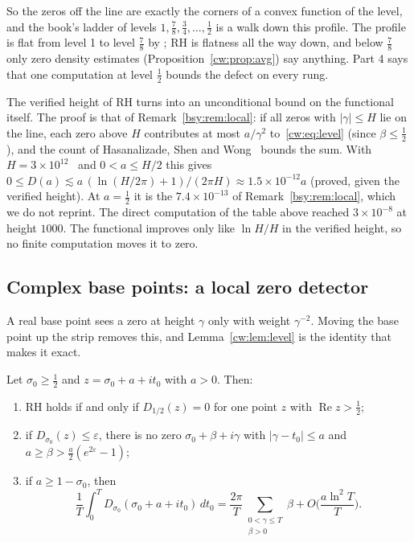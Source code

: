 So the zeros off the line are exactly the corners of a convex function of the level, and the book's ladder of levels $1,\frac78,\frac34,\dots,\frac12$ is a walk down this profile. The profile is flat from level 1 to level $\frac78$ by \cite{OAI26a}; RH is flatness all the way down, and below $\frac78$ only zero density estimates (Proposition~\ref{cw:prop:avg}) say anything. Part 4 says that one computation at level $\frac12$ bounds the defect on every rung.

The verified height of RH turns into an unconditional bound on the functional itself. The proof is that of Remark~\ref{bsy:rem:local}: if all zeros with $|\gamma|\le H$ lie on the line, each zero above $H$ contributes at most $a/\gamma^2$ to~\eqref{cw:eq:level} (since $\beta\le\frac12$), and the count of Hasanalizade, Shen and Wong~\cite{HSW22} bounds the sum. With $H=3\times10^{12}$~\cite{PT21} and $0<a\le H/2$ this gives $0\le D(a)\lesssim a\,(\ln(H/2\pi)+1)/(2\pi H)\approx1.5\times10^{-12}a$ (proved, given the verified height). At $a=\frac12$ it is the $7.4\times10^{-13}$ of Remark~\ref{bsy:rem:local}, which we do not reprint. The direct computation of the table above reached $3\times10^{-8}$ at height $1000$. The functional improves only like $\ln H/H$ in the verified height, so no finite computation moves it to zero.

\subsection{Complex base points: a local zero detector}\label{cw:sec:local}
A real base point sees a zero at height $\gamma$ only with weight $\gamma^{-2}$. Moving the base point up the strip removes this, and Lemma~\ref{cw:lem:level} is the identity that makes it exact.

\begin{theorem}[proved]\label{cw:thm:local}
Let $\sigma_0\ge\frac12$ and $z=\sigma_0+a+it_0$ with $a>0$. Then:
\begin{enumerate}
\item RH holds if and only if $D_{1/2}(z)=0$ for one point $z$ with $\operatorname{Re}z>\frac12$;
\item if $D_{\sigma_0}(z)\le\varepsilon$, there is no zero $\sigma_0+\beta+i\gamma$ with $|\gamma-t_0|\le a$ and $a\ge\beta>\frac a2(e^{2\varepsilon}-1)$;
\item if $a\ge1-\sigma_0$, then
\[
\frac1T\int_0^TD_{\sigma_0}(\sigma_0+a+it_0)\,dt_0=\frac{2\pi}T\sum_{\substack{0<\gamma\le T\\ \beta>0}}\beta+O\Big(\frac{a\ln^2T}T\Big).
\]
\end{enumerate}
\end{theorem}

